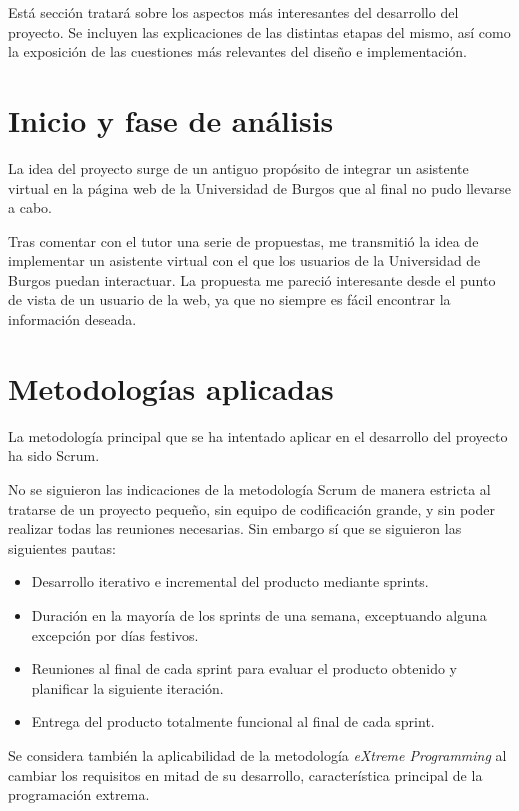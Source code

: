
Está sección tratará sobre los aspectos más interesantes del desarrollo del proyecto. Se incluyen las explicaciones de las distintas etapas del mismo, así como la exposición de las cuestiones más relevantes del diseño e implementación.

\section{Inicio y fase de análisis}

La idea del proyecto surge de un antiguo propósito de integrar un asistente virtual en la página web de la Universidad de Burgos que al final no pudo llevarse a cabo.

Tras comentar con el tutor una serie de propuestas, me transmitió la idea de implementar un asistente virtual con el que los usuarios de la Universidad de Burgos puedan interactuar. La propuesta me pareció interesante desde el punto de vista de un usuario de la web, ya que no siempre es fácil encontrar la información deseada.

\section{Metodologías aplicadas}

La metodología principal que se ha intentado aplicar en el desarrollo del proyecto ha sido Scrum.

No se siguieron las indicaciones de la metodología Scrum de manera estricta al tratarse de un proyecto pequeño, sin equipo de codificación grande, y sin poder realizar todas las reuniones necesarias. Sin embargo sí que se siguieron las siguientes pautas:

\begin{itemize}
\tightlist
\item
Desarrollo iterativo e incremental del producto mediante sprints.
\item
Duración en la mayoría de los sprints de una semana, exceptuando alguna excepción por días festivos.
\item
Reuniones al final de cada sprint para evaluar el producto obtenido y planificar la siguiente iteración.
\item
Entrega del producto totalmente funcional al final de cada sprint.
\end{itemize}

Se considera también la aplicabilidad de la metodología \emph{eXtreme Programming} al cambiar los requisitos en mitad de su desarrollo, característica principal de la programación extrema.

